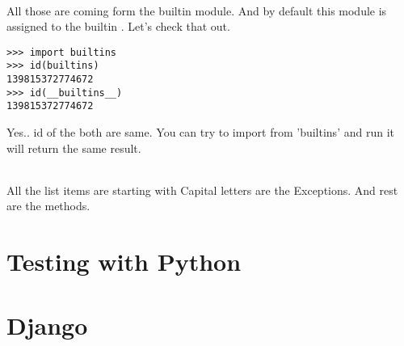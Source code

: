 \documentclass[letterpaper,12pt]{book}
\begin{document}
\paragraph{}
All those are coming form the builtin module. And by default this module is assigned to the \textunderscore \textunderscore builtin \textunderscore \textunderscore.
Let's check that out.
\begin{lstlisting}
>>> import builtins
>>> id(builtins)
139815372774672
>>> id(__builtins__)
139815372774672
\end{lstlisting}
Yes.. id of the both are same. You can try to import from 'builtins' and run it will return the same result.
\paragraph{}
All the list items are starting with Capital letters are the Exceptions. And rest are the methods.
\part{Testing with Python}
\part{Django}
\end{document}
